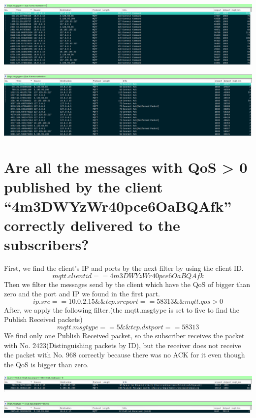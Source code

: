 \documentclass[10pt,english, openany]{book}
\begin{document}
\includegraphics[scale=0.27]{7-1.png}

\includegraphics[scale=0.27]{7-2.png}


\section{Are all the messages with QoS > 0 published by the client\\ “4m3DWYzWr40pce6OaBQAfk” correctly delivered to the subscribers?}
First, we find the client's IP and ports by the next filter by using the client ID.
\begin{equation*}mqtt.clientid==4m3DWYzWr40pce6OaBQAfk\end{equation*}
Then we filter the messages send by the client which have the QoS of bigger than zero and the port and IP we found in the first part. 
\begin{equation*}ip.src==10.0.2.15 \&\& tcp.srcport==58313 \&\& mqtt.qos > 0\end{equation*}
After, we apply the following filter.(the mqtt.msgtype is set to five to find the Publish Received packets)
\begin{equation*}mqtt.msgtype == 5 \&\& tcp.dstport==58313\end{equation*}
We find only one Publish Received packet, so the subscriber receives the packet with No. 2423(Distinguishing packets by ID), but the receiver does not receive the packet with No. 968 correctly because there was no ACK for it even though the QoS is bigger than zero.

\includegraphics[scale=0.27]{8-1.png}

\includegraphics[scale=0.27]{8-2.png}
\end{document}
